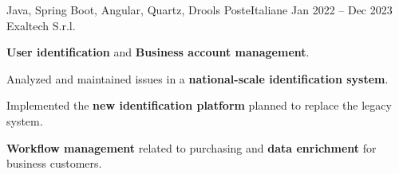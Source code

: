   \cventry
    {Java, Spring Boot, Angular, Quartz, Drools} %
    {PosteItaliane} %
    {Jan 2022 – Dec 2023} %
    {Exaltech S.r.l.} %
    {
      \begin{cvitems} %
        \item {\textbf{User identification} and \textbf{Business account management}.}
        \item {Analyzed and maintained issues in a \textbf{national-scale identification system}.}
        \item {Implemented the \textbf{new identification platform} planned to replace the legacy system.}  
        \item {\textbf{Workflow management} related to purchasing and \textbf{data enrichment} for business customers.}  
      \end{cvitems}
    }